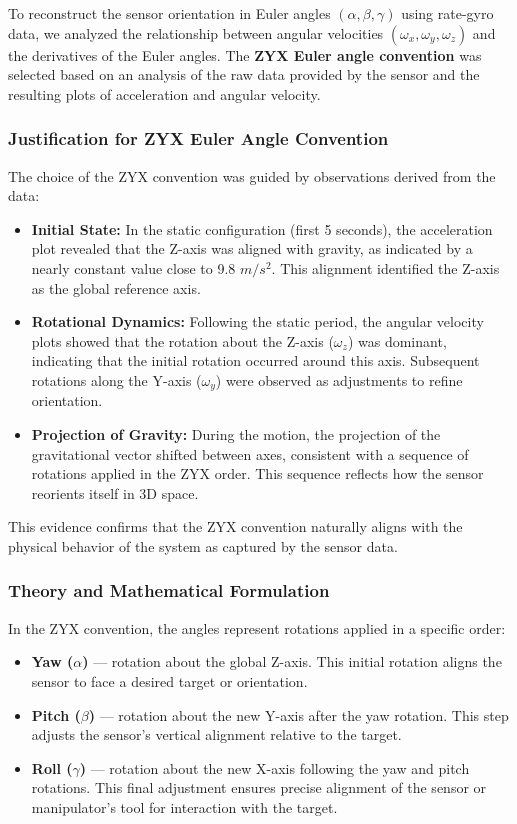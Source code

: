 \documentclass[12pt]{article}
\begin{document}
To reconstruct the sensor orientation in Euler angles \((\alpha, \beta, \gamma)\) using rate-gyro data, we analyzed the relationship between angular velocities \((\omega_x, \omega_y, \omega_z)\) and the derivatives of the Euler angles. The \textbf{ZYX Euler angle convention} was selected based on an analysis of the raw data provided by the sensor and the resulting plots of acceleration and angular velocity.

\subsubsection{Justification for ZYX Euler Angle Convention}

The choice of the ZYX convention was guided by observations derived from the data:
\begin{itemize}
    \item \textbf{Initial State:} In the static configuration (first 5 seconds), the acceleration plot revealed that the Z-axis was aligned with gravity, as indicated by a nearly constant value close to 9.8 $m/s^{2}$. This alignment identified the Z-axis as the global reference axis.
    \item \textbf{Rotational Dynamics:} Following the static period, the angular velocity plots showed that the rotation about the Z-axis (\(\omega_z\)) was dominant, indicating that the initial rotation occurred around this axis. Subsequent rotations along the Y-axis (\(\omega_y\)) were observed as adjustments to refine orientation.
    \item \textbf{Projection of Gravity:} During the motion, the projection of the gravitational vector shifted between axes, consistent with a sequence of rotations applied in the ZYX order. This sequence reflects how the sensor reorients itself in 3D space.
\end{itemize}

This evidence confirms that the ZYX convention naturally aligns with the physical behavior of the system as captured by the sensor data.

\subsubsection{Theory and Mathematical Formulation}

In the ZYX convention, the angles represent rotations applied in a specific order:
\begin{itemize}
    \item \textbf{Yaw (\(\alpha\))} — rotation about the global Z-axis. This initial rotation aligns the sensor to face a desired target or orientation.
    \item \textbf{Pitch (\(\beta\))} — rotation about the new Y-axis after the yaw rotation. This step adjusts the sensor's vertical alignment relative to the target.
    \item \textbf{Roll (\(\gamma\))} — rotation about the new X-axis following the yaw and pitch rotations. This final adjustment ensures precise alignment of the sensor or manipulator's tool for interaction with the target.
\end{itemize}
\end{document}
